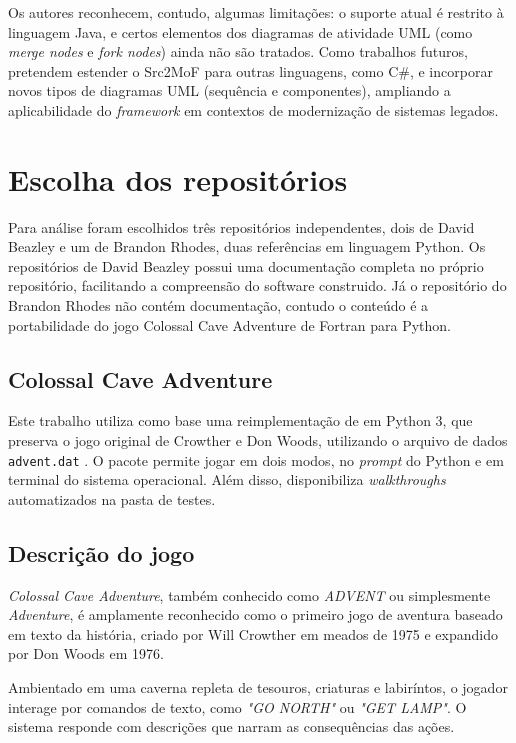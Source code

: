 \documentclass[12pt,a4paper]{article}
\begin{document}
Os autores reconhecem, contudo, algumas limitações: o suporte atual é restrito à linguagem Java, e certos elementos dos diagramas de atividade UML (como \textit{merge nodes} e \textit{fork nodes}) ainda não são tratados. Como trabalhos futuros, pretendem estender o Src2MoF para outras linguagens, como C\#, e incorporar novos tipos de diagramas UML (sequência e componentes), ampliando a aplicabilidade do \textit{framework} em contextos de modernização de sistemas legados.

\section{Escolha dos repositórios}
Para análise foram escolhidos três repositórios independentes, dois de David Beazley e um de Brandon Rhodes, duas referências em linguagem Python. Os repositórios de David Beazley possui uma documentação completa no próprio repositório, facilitando a compreensão do software construido. Já o repositório do Brandon Rhodes não contém documentação, contudo o conteúdo é a portabilidade do jogo Colossal Cave Adventure de Fortran para Python.

\subsection{Colossal Cave Adventure}
Este trabalho utiliza como base uma reimplementação de \textcite{rhodes_adventure_py} em Python 3, que preserva o jogo original de Crowther e Don Woods, utilizando o arquivo de dados \texttt{advent.dat} \textcite{adventure_original_sources}. O pacote permite jogar em dois modos, no \emph{prompt} do Python e em terminal do sistema operacional. Além disso, disponibiliza \textit{walkthroughs} automatizados na pasta de testes.

\subsection{Descrição do jogo}

\textit{Colossal Cave Adventure}, também conhecido como \textit{ADVENT} ou simplesmente \textit{Adventure}, é amplamente reconhecido como o primeiro jogo de aventura baseado em texto da história, criado por Will Crowther em meados de 1975 e expandido por Don Woods em 1976. 

Ambientado em uma caverna repleta de tesouros, criaturas e labiríntos, o jogador interage por comandos de texto, como \textit{"GO NORTH"} ou \textit{"GET LAMP"}. O sistema responde com descrições que narram as consequências das ações.
\end{document}
